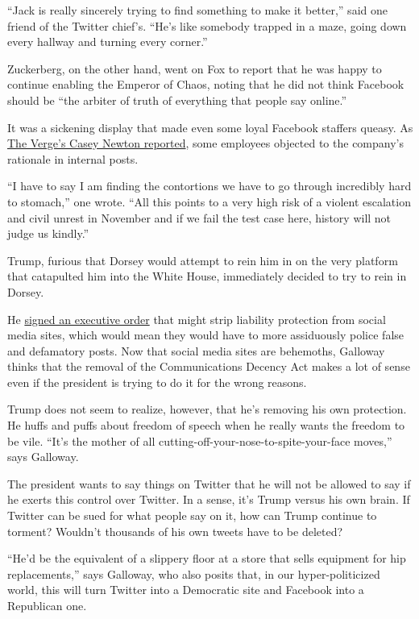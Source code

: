 ``Jack is really sincerely trying to find something to make it better,''
said one friend of the Twitter chief's. ``He's like somebody trapped in
a maze, going down every hallway and turning every corner.''

Zuckerberg, on the other hand, went on Fox to report that he was happy
to continue enabling the Emperor of Chaos, noting that he did not think
Facebook should be ``the arbiter of truth of everything that people say
online.''

It was a sickening display that made even some loyal Facebook staffers
queasy. As
\href{https://www.theverge.com/2020/5/29/21275044/facebook-trump-tweets-employee-reaction-criticism}{The
Verge's Casey Newton reported}, some employees objected to the company's
rationale in internal posts.

``I have to say I am finding the contortions we have to go through
incredibly hard to stomach,'' one wrote. ``All this points to a very
high risk of a violent escalation and civil unrest in November and if we
fail the test case here, history will not judge us kindly.''

Trump, furious that Dorsey would attempt to rein him in on the very
platform that catapulted him into the White House, immediately decided
to try to rein in Dorsey.

He
\href{https://www.nytimes.com/2020/05/28/us/politics/trump-order-social-media.html}{signed
an executive order} that might strip liability protection from social
media sites, which would mean they would have to more assiduously police
false and defamatory posts. Now that social media sites are behemoths,
Galloway thinks that the removal of the Communications Decency Act makes
a lot of sense even if the president is trying to do it for the wrong
reasons.

Trump does not seem to realize, however, that he's removing his own
protection. He huffs and puffs about freedom of speech when he really
wants the freedom to be vile. ``It's the mother of all
cutting-off-your-nose-to-spite-your-face moves,'' says Galloway.

The president wants to say things on Twitter that he will not be allowed
to say if he exerts this control over Twitter. In a sense, it's Trump
versus his own brain. If Twitter can be sued for what people say on it,
how can Trump continue to torment? Wouldn't thousands of his own tweets
have to be deleted?

``He'd be the equivalent of a slippery floor at a store that sells
equipment for hip replacements,'' says Galloway, who also posits that,
in our hyper-politicized world, this will turn Twitter into a Democratic
site and Facebook into a Republican one.

